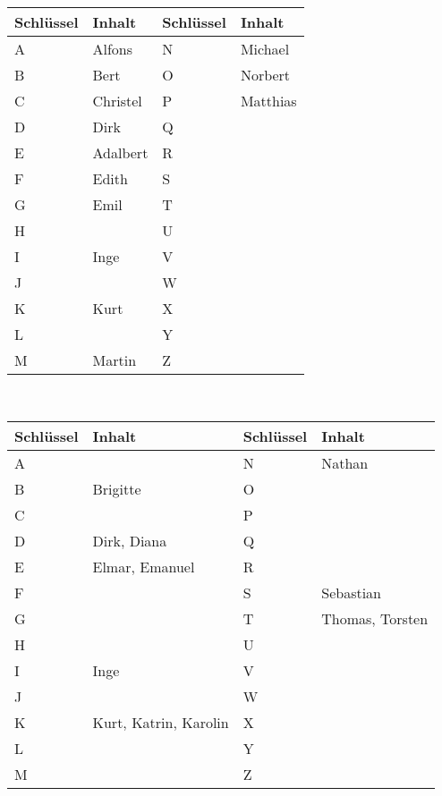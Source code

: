 \begin{aufgabe}%

\begin{teile}
	\item 
    \begin{tabular}[t]{|>{\centering\arraybackslash}p{2cm}|p{4cm}|>{\centering\arraybackslash}p{2cm}|p{4cm}|}
        \hline
        \textbf{Schlüssel} & \textbf{Inhalt} & \textbf{Schlüssel} & \textbf{Inhalt} \\
        \hline
        A & Alfons & N & Michael \\
        \hline
        B & Bert & O & Norbert \\
        \hline
        C & Christel & P & Matthias \\
        \hline
        D & Dirk & Q & \\
        \hline
        E & Adalbert & R & \\
        \hline
        F & Edith & S & \\
        \hline
        G & Emil & T & \\
        \hline
        H & & U & \\
        \hline
        I & Inge & V & \\
        \hline
        J & & W & \\
        \hline
        K & Kurt & X & \\
        \hline
        L & & Y & \\
        \hline
        M & Martin & Z & \\
        \hline
    \end{tabular} \\

	\item
    \begin{tabular}[t]{|>{\centering\arraybackslash}p{2cm}|p{4cm}|>{\centering\arraybackslash}p{2cm}|p{4cm}|}
        \hline
        \textbf{Schlüssel} & \textbf{Inhalt} & \textbf{Schlüssel} & \textbf{Inhalt} \\
        \hline
        A &  & N & Nathan \\
        \hline
        B & Brigitte & O &  \\
        \hline
        C &  & P &  \\
        \hline
        D & Dirk, Diana & Q & \\
        \hline
        E & Elmar, Emanuel & R & \\
        \hline
        F &  & S & Sebastian \\
        \hline
        G &  & T & Thomas, Torsten \\
        \hline
        H & & U & \\
        \hline
        I & Inge & V & \\
        \hline
        J & & W & \\
        \hline
        K & Kurt, Katrin, Karolin & X & \\
        \hline
        L & & Y & \\
        \hline
        M &  & Z & \\
        \hline
    \end{tabular}
\end{teile}		
\end{aufgabe}

